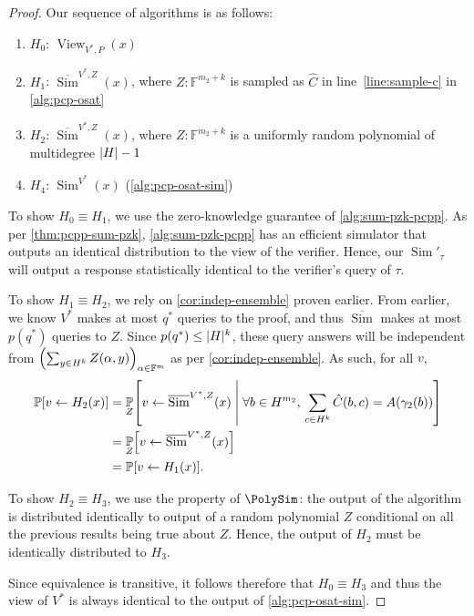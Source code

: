 \documentclass[english,12pt]{reedthesis}
\theoremstyle{plain}
\theoremstyle{definition}
\theoremstyle{remark}
\DeclareMathOperator{\Sim}{Sim}
\DeclareMathOperator{\View}{View}
\DeclarePairedDelimiter{\abs}{\lvert}{\rvert}
\newcommand{\middlemid}{%
  \ensuremath{\;\middle\vert\;}
}
\begin{document}
\begin{proof}
  Our sequence of algorithms is as follows:
  \begin{enumerate}
    \item $H_{0}$: $\View_{V^{*}, P}(x)$
    \item $H_{1}$: $\overline{\Sim}^{V^{*}, Z}(x)$, where
          $Z\colon \mathbb{F}^{m_{2}+k}$ is sampled as $\hat{C}$ in
          line~\ref{line:sample-c} in \cref{alg:pcp-osat}
    \item $H_{2}$: $\overline{\Sim}^{V^{*}, Z}(x)$, where
          $Z\colon \mathbb{F}^{m_{2}+k}$ is a uniformly random polynomial of
          multidegree $\abs{H} - 1$
    \item $H_{4}$: $\Sim^{V^{*}}(x)$ (\cref{alg:pcp-osat-sim})
  \end{enumerate}

  To show $H_{0} \equiv H_{1}$, we use the zero-knowledge guarantee of
  \cref{alg:sum-pzk-pcpp}. As per \cref{thm:pcpp-sum-pzk},
  \cref{alg:sum-pzk-pcpp} has an efficient simulator that outputs an identical
  distribution to the view of the verifier. Hence, our $\Sim'_{\tau}$ will output
  a response statistically identical to the verifier's query of $\tau$.

  To show $H_{1} \equiv H_{2}$, we rely on \cref{cor:indep-ensemble} proven earlier.
  From earlier, we know $V^{*}$ makes at most $q^{*}$ queries to the proof, and
  thus $\overline{\Sim}$ makes at most $p(q^{*})$ queries to $Z$. Since
  $p(q^{*}) \le \abs{H}^{k}$, these query answers will be independent from
  $\mleft(\sum_{y \in H^{k}}Z(\alpha, y)\mright)_{\alpha \in \mathbb{F}^{m}}$ as per
  \cref{cor:indep-ensemble}. As such, for all $v$,
  \begin{align*}
    \mathbb{P}[v \leftarrow H_{2}(x)] &= \underset{Z}{\mathbb{P}}\mleft[
                        v \leftarrow \overline{\Sim}^{V^{*}, Z}(x) \middlemid
                        \forall b \in H^{m_{2}},\,\sum_{c \in H^{k}}\hat{C}(b, c) = A(\gamma_{2}(b))
                      \mright] \\
                    &= \underset{Z}{\mathbb{P}}\mleft[
                        v \leftarrow \overline{\Sim}^{V^{*}, Z}(x)
                      \mright] \\
                    &= \mathbb{P}[v \leftarrow H_{1}(x)].
  \end{align*}

  To show $H_{2} \equiv H_{3}$, we use the property of $\PolySim$: the output of the
  algorithm is distributed identically to output of a random polynomial $Z$
  conditional on all the previous results being true about $Z$. Hence, the
  output of $H_{2}$ must be identically distributed to $H_{3}$.

  Since equivalence is transitive, it follows therefore that $H_{0} \equiv H_{3}$ and
  thus the view of $V^{*}$ is always identical to the output of
  \cref{alg:pcp-osat-sim}.
\end{proof}
\end{document}
